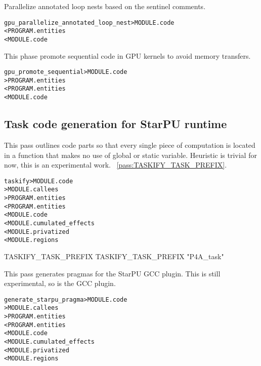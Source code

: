 \documentclass[a4paper]{report}
\newenvironment{PipsMake}{\begin{alltt}}{\end{alltt}}
\newcommand{\PipsPassRef}[1]{\texttt{\detokenize{#1}}~\ref{pass:#1}}
\newenvironment{PipsPass}[1]{\label{pass:#1}}{}
\begin{document}
\begin{PipsPass}{gpu_parallelize_annotated_loop_nest}
Parallelize annotated loop nests based on the sentinel comments.
\end{PipsPass}

\begin{PipsMake}
gpu_parallelize_annotated_loop_nest        > MODULE.code
        < PROGRAM.entities
        < MODULE.code

\end{PipsMake}



\begin{PipsPass}{gpu_promote_sequential}
This phase promote sequential code in GPU kernels to avoid memory transfers.
\end{PipsPass}

\begin{PipsMake}
gpu_promote_sequential	> MODULE.code
		> PROGRAM.entities
		< PROGRAM.entities
		< MODULE.code
\end{PipsMake}


\subsection{Task code generation for StarPU runtime}
\label{subsection-stapu-taskify}

\begin{PipsPass}{taskify}
This pass outlines code parts so that every single piece of computation is 
located in a function that makes no use of global or static variable. 
Heuristic is trivial for now, this is an experimental work.
\PipsPassRef{TASKIFY_TASK_PREFIX}.
\end{PipsPass}
\begin{PipsMake}
taskify                        > MODULE.code
                               > MODULE.callees
                               > PROGRAM.entities
               < PROGRAM.entities
               < MODULE.code
               < MODULE.cumulated_effects
               < MODULE.privatized
               < MODULE.regions
\end{PipsMake}

\begin{PipsProp}{TASKIFY_TASK_PREFIX}
TASKIFY_TASK_PREFIX "P4A_task"
\end{PipsProp}



\begin{PipsPass}{generate_starpu_pragma}
This pass generates pragmas for the StarPU GCC plugin. This is still 
experimental, so is the GCC plugin.
\end{PipsPass}
\begin{PipsMake}
generate_starpu_pragma         > MODULE.code
                               > MODULE.callees
                               > PROGRAM.entities
               < PROGRAM.entities
               < MODULE.code
               < MODULE.cumulated_effects
               < MODULE.privatized
               < MODULE.regions
\end{PipsMake}
\end{document}
